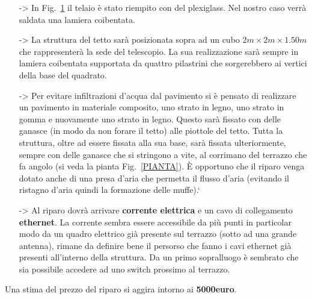 \begin{itemize}
\begin{figure}
\begin{subfigure}[b]{0.4\textwidth}
		\caption{Struttura di esempio col tetto aperto e i supporti laterali}
	\end{subfigure}
	\caption{Modalit\`a di riparo con apertura a \textit{fiore}}
	\label{SERR:FIORE}
\end{figure}
	\item[->] In Fig.~\ref{SERR:FIORE} il telaio \`e stato riempito con del plexiglass. Nel nostro caso verr\`a saldata una lamiera coibentata.
	\item[->] La struttura del tetto sar\`a posizionata sopra ad un cubo $2m\times2m\times1.50m$
	      che rappresenter\`a la sede del telescopio. La sua realizzazione sar\`a sempre in lamiera coibentata supportata da quattro pilastrini che sorgerebbero ai vertici della base del quadrato.
      \item[->] Per evitare infiltrazioni d'acqua dal pavimento si \`e pensato di realizzare un pavimento in materiale composito, uno strato in legno, uno strato in gomma e nuovamente uno strato in legno. Questo sar\`a fissato con delle ganasce (in modo da non forare il tetto) alle piottole del tetto. Tutta la struttura, oltre ad essere fissata alla sua base, sar\`a fissata ulteriormente, sempre con delle ganasce che si stringono a vite, al corrimano del terrazzo che fa angolo (si veda la pianta Fig.~\ref{PIANTA}). \`E opportuno che il riparo venga dotato anche di una presa d'aria che permetta il flusso d'aria (evitando il ristagno d'aria quindi la formazione delle muffe).`
      \item[->] Al riparo dovr\`a arrivare \textbf{corrente elettrica} e un cavo di collegamento \textbf{ethernet}. La corrente sembra essere accessibile da pi\`u punti in particolar modo da un quadro elettrico gi\`a presente sul terrazzo (sotto ad una grande antenna), rimane da definire bene il persorso che fanno i cavi ethernet gi\`a presenti all'interno della struttura. Da un primo sopralluogo \`e sembrato che sia possibile accedere ad uno switch prossimo al terrazzo.

\end{itemize}
Una stima del prezzo del riparo si aggira intorno ai \textbf{5000euro}.

